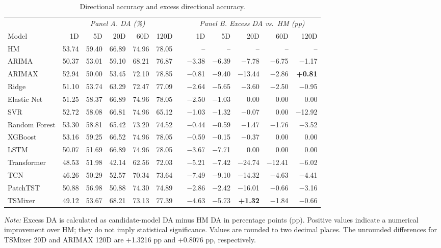 \documentclass[12pt,twoside]{ord}
\begin{document}
\begin{table}[htbp]
\centering
\caption{Directional accuracy and excess directional accuracy.}\label{tab:da_main}
{\small
\setlength{\tabcolsep}{5pt}
\begin{tabular}{lrrrrr@{\hspace{4pt}}c@{\hspace{4pt}}rrrrr}
\hline
 & \multicolumn{5}{c}{\textit{Panel A. DA (\%)}} & & \multicolumn{5}{c}{\textit{Panel B. Excess DA vs.\ HM (pp)}} \\
\cline{2-6}\cline{8-12}
Model & 1D & 5D & 20D & 60D & 120D & & 1D & 5D & 20D & 60D & 120D \\
\hline
HM & 53.74 & 59.40 & 66.89 & 74.96 & 78.05 & & -- & -- & -- & -- & -- \\
ARIMA & 50.37 & 53.01 & 59.10 & 68.21 & 76.87 & & $-$3.38 & $-$6.39 & $-$7.78 & $-$6.75 & $-$1.17 \\
ARIMAX & 52.94 & 50.00 & 53.45 & 72.10 & 78.85 & & $-$0.81 & $-$9.40 & $-$13.44 & $-$2.86 & \textbf{+0.81} \\
Ridge & 51.10 & 53.74 & 63.29 & 72.47 & 77.09 & & $-$2.64 & $-$5.65 & $-$3.60 & $-$2.50 & $-$0.95 \\
Elastic Net & 51.25 & 58.37 & 66.89 & 74.96 & 78.05 & & $-$2.50 & $-$1.03 & 0.00 & 0.00 & 0.00 \\
SVR & 52.72 & 58.08 & 66.81 & 74.96 & 65.12 & & $-$1.03 & $-$1.32 & $-$0.07 & 0.00 & $-$12.92 \\
Random Forest & 53.30 & 58.81 & 65.42 & 73.20 & 74.52 & & $-$0.44 & $-$0.59 & $-$1.47 & $-$1.76 & $-$3.52 \\
XGBoost & 53.16 & 59.25 & 66.52 & 74.96 & 78.05 & & $-$0.59 & $-$0.15 & $-$0.37 & 0.00 & 0.00 \\
LSTM & 50.07 & 51.69 & 66.89 & 74.96 & 78.05 & & $-$3.67 & $-$7.71 & 0.00 & 0.00 & 0.00 \\
Transformer & 48.53 & 51.98 & 42.14 & 62.56 & 72.03 & & $-$5.21 & $-$7.42 & $-$24.74 & $-$12.41 & $-$6.02 \\
TCN & 46.26 & 50.29 & 52.57 & 70.34 & 73.64 & & $-$7.49 & $-$9.10 & $-$14.32 & $-$4.63 & $-$4.41 \\
PatchTST & 50.88 & 56.98 & 50.88 & 74.30 & 74.89 & & $-$2.86 & $-$2.42 & $-$16.01 & $-$0.66 & $-$3.16 \\
TSMixer & 49.12 & 53.67 & 68.21 & 73.13 & 77.39 & & $-$4.63 & $-$5.73 & \textbf{+1.32} & $-$1.84 & $-$0.66 \\
\hline
\end{tabular}}
\par\vspace{4pt}\parbox{\linewidth}{\fontsize{9pt}{12pt}\selectfont\textit{Note:} Excess DA is calculated as candidate-model DA minus HM DA in percentage points (pp). Positive values indicate a numerical improvement over HM; they do not imply statistical significance. Values are rounded to two decimal places. The unrounded differences for TSMixer 20D and ARIMAX 120D are +1.3216 pp and +0.8076 pp, respectively.}
\end{table}
\end{document}

